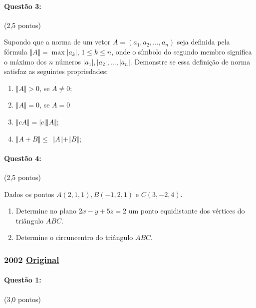 \documentclass[12pt,a4paper]{article}
\newcommand{\original}[1]{\tiny \href{#1}{Original} \normalsize}
\begin{document}
\paragraph{Questão 3:} (2,5 pontos)

Supondo que a norma de um vetor $A=(a_1,a_2,\dots,a_n)$ seja definida pela fórmula $\Vert A \Vert = \max \vert a_k \vert$, $1\leq k \leq n$, onde o símbolo do segundo membro significa o máximo dos $n$ números $\vert a_1 \vert, \vert a_2 \vert,\dots,\vert a_n \vert$. Demonstre se essa definição de norma satisfaz as seguintes propriedades:
\begin{enumerate}
\item $\Vert A \Vert > 0$, se $ A \neq 0 $;
\item $\Vert A \Vert = 0 $, se $A = 0$
\item $\Vert cA \Vert = \vert c \vert \Vert A \Vert$;
\item $\Vert A + B\Vert \leq $ $\Vert A \Vert +\Vert B \Vert$;
\end{enumerate}

\paragraph{Questão 4:} (2,5 pontos)

Dados os pontos $A(2,1,1),B(-1,2,1)$ e $C(3,-2,4)$.
\begin{enumerate}
\item Determine no plano $2x-y+5z=2$ um ponto equidistante dos vértices do triângulo $ABC$.
\item Determine o circuncentro do triângulo $ABC$.
\end{enumerate}
\newpage
\subsubsection{2002 \original{https://drive.google.com/file/d/1jHizQEs33wQWcvFq_KMxZ1QMRuE5RRiW/view?usp=sharing}}

\paragraph{Questão 1:} (3,0 pontos) 
\end{document}
